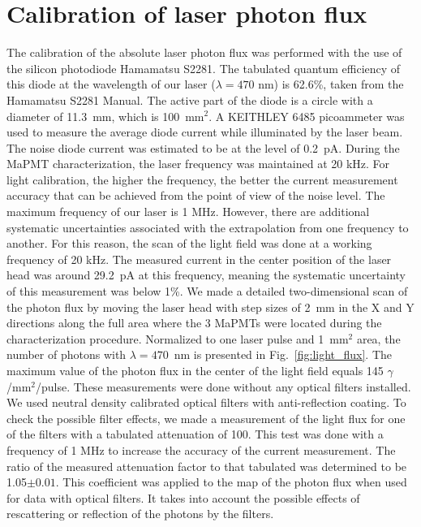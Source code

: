 \section{Calibration of laser photon flux}

The calibration of the absolute laser photon flux was performed with the use of the silicon photodiode Hamamatsu S2281.
The tabulated quantum efficiency of this diode at the wavelength of our laser ($\lambda=470$ nm) is 62.6\%, taken from the Hamamatsu S2281 Manual. 
The active part of the diode is a circle with a diameter of 11.3~mm, which is 100~mm$^2$. 
A KEITHLEY 6485 picoammeter was used to measure the average diode current while illuminated by the laser beam.
The noise diode current was estimated to be at the level of 0.2~pA. 
During the MaPMT characterization, the laser frequency was maintained at 20 kHz. 
For light calibration, the higher the frequency, the better the current measurement accuracy that can be achieved from the point of view of the noise level. 
The maximum frequency of our laser is 1 MHz.
However, there are additional systematic uncertainties associated with the extrapolation from one frequency to another. 
For this reason, the scan of the light field was done at a working frequency of 20 kHz. 
The measured current in the center position of the laser head was around 29.2~pA at this frequency, meaning the systematic uncertainty
of this measurement was below 1\%.  We made a detailed two-dimensional scan of the photon flux by
moving the laser head with step sizes of 2~mm in the X and Y directions along the full area where the 3 MaPMTs were located during the characterization procedure.
Normalized to one laser pulse and 1~mm$^2$ area, the number of photons with $\lambda=470$~nm  is presented in Fig.~\ref{fig:light_flux}.
The maximum value of the photon flux in the center of the light field equals 145 $\gamma$/mm$^2$/pulse.
These measurements were done without  any optical filters installed. We used neutral density calibrated optical filters with anti-reflection coating.
To check the possible filter effects, we made a measurement of the light flux for one of the filters with a tabulated attenuation of 100. 
This test was done with a frequency of 1 MHz to increase the accuracy of the current measurement. 
The ratio of the measured attenuation factor to that tabulated was determined to be 1.05$\pm 0.01$. This coefficient was applied to the map of the photon flux when used for data with optical filters. It takes into account the possible effects of rescattering or reflection of the photons by the filters.
